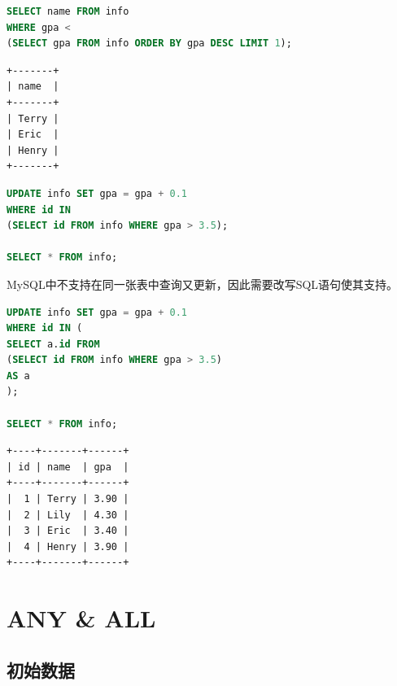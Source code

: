 \documentclass[12pt, openany, oneside]{book}
\begin{document}

\begin{lstlisting}[language=SQL]
SELECT name FROM info
WHERE gpa <
(SELECT gpa FROM info ORDER BY gpa DESC LIMIT 1);
\end{lstlisting}

\begin{tcolorbox}
    \begin{verbatim}
+-------+
| name  |
+-------+
| Terry |
| Eric  |
| Henry |
+-------+
	\end{verbatim}
\end{tcolorbox}

\vspace{0.5cm}


\begin{lstlisting}[language=SQL]
UPDATE info SET gpa = gpa + 0.1
WHERE id IN
(SELECT id FROM info WHERE gpa > 3.5);

SELECT * FROM info;
\end{lstlisting}

MySQL中不支持在同一张表中查询又更新，因此需要改写SQL语句使其支持。 \\


\begin{lstlisting}[language=SQL]
UPDATE info SET gpa = gpa + 0.1
WHERE id IN (
SELECT a.id FROM
(SELECT id FROM info WHERE gpa > 3.5)
AS a
);

SELECT * FROM info;
\end{lstlisting}

\begin{tcolorbox}
    \begin{verbatim}
+----+-------+------+
| id | name  | gpa  |
+----+-------+------+
|  1 | Terry | 3.90 |
|  2 | Lily  | 4.30 |
|  3 | Eric  | 3.40 |
|  4 | Henry | 3.90 |
+----+-------+------+
	\end{verbatim}
\end{tcolorbox}

\newpage

\chapter{ANY \& ALL}

\section{初始数据}
\end{document}
